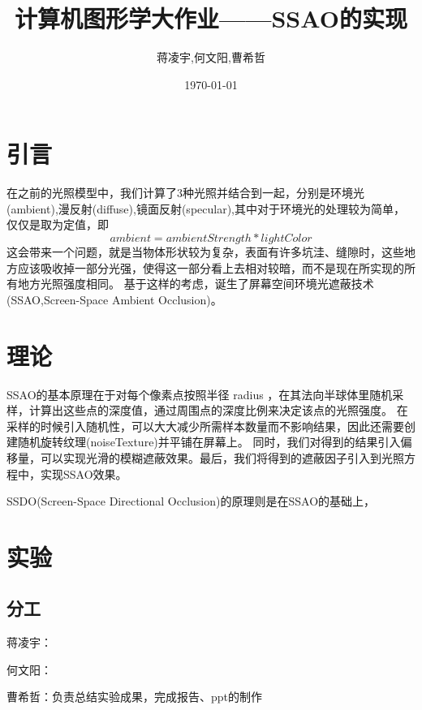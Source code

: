 \documentclass[UTF8,a4paper,12pt,oneside]{article}
\title{计算机图形学大作业——SSAO的实现}
\author{蒋凌宇,何文阳,曹希哲}
\date{\today}
\begin{document}
\maketitle
\section{引言}
在之前的光照模型中，我们计算了3种光照并结合到一起，分别是环境光(ambient),漫反射(diffuse),镜面反射(specular),其中对于环境光的处理较为简单，
仅仅是取为定值，即
$$ambient = ambientStrength * lightColor$$
这会带来一个问题，就是当物体形状较为复杂，表面有许多坑洼、缝隙时，这些地方应该吸收掉一部分光强，使得这一部分看上去相对较暗，而不是现在所实现的所有地方光照强度相同。
基于这样的考虑，诞生了屏幕空间环境光遮蔽技术(SSAO,Screen-Space Ambient Occlusion)。

\section{理论}
SSAO的基本原理在于对每个像素点按照半径 radius ，在其法向半球体里随机采样，计算出这些点的深度值，通过周围点的深度比例来决定该点的光照强度。
在采样的时候引入随机性，可以大大减少所需样本数量而不影响结果，因此还需要创建随机旋转纹理(noiseTexture)并平铺在屏幕上。
同时，我们对得到的结果引入偏移量，可以实现光滑的模糊遮蔽效果。最后，我们将得到的遮蔽因子引入到光照方程中，实现SSAO效果。

SSDO(Screen-Space Directional Occlusion)的原理则是在SSAO的基础上，

\section{实验}
\subsection{分工}
蒋凌宇：

何文阳：

曹希哲：负责总结实验成果，完成报告、ppt的制作
\end{document}
